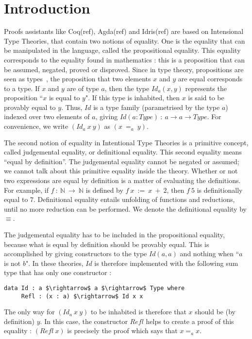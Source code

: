 \section{Introduction}

Proofs assistants like Coq(ref), Agda(ref) and Idris(ref) are based on Intensional Type Theories, that contain two notions of equality. One is the equality that can be manipulated in the language, called the propositional equality. This equality corresponds to the equality found in mathematics : this is a proposition that can be assumed, negated, proved or disproved. Since in type theory, propositions are seen as types~\cite{How80}, the
proposition that two elements $x$ and $y$ are equal corresponds to a type.
If $x$ and $y$ are of type $a$, then the type
$Id_a(x, y)$ represents the proposition ``$x$ is equal to $y$". If this type is
inhabited, then $x$ is said to be provably equal to $y$. Thus, $Id$ is a type family (parametrised by the type $a$) indexed over two elements of $a$, giving $Id (a:Type)\ :\ a \rightarrow a \rightarrow Type$. For
convenience, we write $(Id_a\ x\ y)$ as $(x\ =_a\ y)$. 

The second notion of equality in Intentional Type Theories is a primitive concept, called judgemental equality, or definitional equality. This second equality means ``equal by definition''. The judgemental equality cannot be negated or assumed; we cannot talk about this primitive equality inside the theory.
Whether or not two expressions are equal by definition is a matter of
evaluating the definitions. For example, if $f\ :\ \mathbb{N}\ \rightarrow\
\mathbb{N}$ is defined by $f\ x\ :=\ x\ +\ 2$, then $f\ 5$ is
definitionally equal to $7$. Definitional equality entails unfolding
of functions and reductions, until no more reduction can be
performed. We denote the definitional equality by $\equiv$.

The judgemental equality has to be included in the propositional equality, because what is equal by definition should be provably equal. This is accomplished by giving constructors to the type $Id(a,a)$ and nothing when ``$a$ is not $b$".
In these theories, $Id$ is therefore implemented with the following sum type that has only one constructor :

\begin{lstlisting}
data Id : a $\rightarrow$ a $\rightarrow$ Type where
     Refl : (x : a) $\rightarrow$ Id x x
\end{lstlisting}

The only way for $(Id_a\ x\ y)$ to be inhabited is therefore that $x$ should be
(by definition) $y$. In this case, the constructor $Refl$ helps to create a
proof of this equality : $(Refl\ x)$ is precisely the proof which says that
$x=_ax$. 

